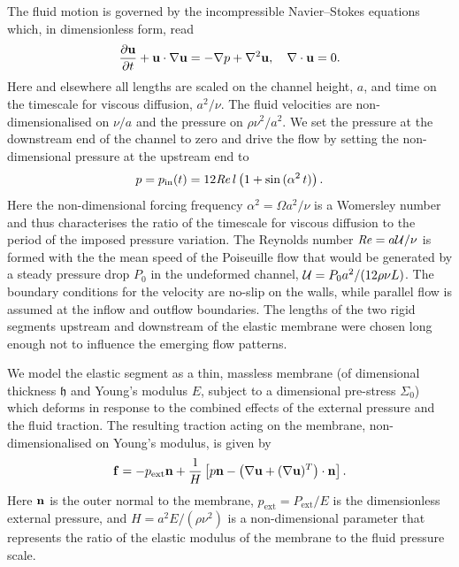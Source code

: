 \documentclass[aps,prl,reprint,superscriptaddress,floatfix]{revtex4-1}
\newcommand{\Rey}{\mathit{Re}}
\begin{document}
The fluid motion is governed by the incompressible Navier--Stokes
equations which, in dimensionless form, read
\begin{equation}
\dfrac{\partial {\bf u}}{\partial t} + {\bf u} \cdot \nabla {\bf
u} = -\nabla  p + \nabla^2  {\bf u},\quad
\nabla \cdot {\bf u}= 0.
\label{eq:NSeqn}
\end{equation}
Here and elsewhere all lengths are scaled on the channel height,
$a$, and time on the timescale for viscous diffusion, $a^2/\nu$.
The fluid velocities are non-dimensionalised on $\nu/a$ and the
pressure on $\rho\nu^2/a^2$.
We set the pressure at the downstream end of the channel to zero
and drive the flow by setting the non-dimensional pressure at the
upstream end to
\begin{equation}
\label{inflow_bc}
p = p_{\rm in}(t)=12 \Rey \,l \left(1 + \sin\,(\alpha^2 \, t)\right).
\end{equation}
Here the non-dimensional forcing frequency $\alpha^2 = \Omega a^2/\nu$ is
a Womersley number and thus characterises the ratio of the
timescale for viscous diffusion to the period of the imposed pressure variation.
The Reynolds number $\Rey = a{\cal U}/\nu$ is formed with the the mean
speed of the Poiseuille flow that would be generated by a steady pressure
drop $P_0$ in the undeformed channel, ${\cal U} = P_0 a^2/(12 \rho \nu
L)$. The boundary conditions for the velocity are no-slip on the walls,
while parallel flow is assumed at the inflow and outflow
boundaries. The lengths of the two rigid segments upstream and
downstream of the elastic membrane were chosen long enough not to
influence the emerging flow patterns. 

We model the elastic segment as a thin, massless
membrane (of dimensional thickness $\mathfrak{h}$ and Young's
modulus $E$, subject to a dimensional pre-stress $\Sigma_0$) which deforms in
response to the combined effects of the external pressure
and the fluid traction. The resulting traction acting on the
membrane, non-dimensionalised on Young's modulus, is given by
\begin{equation}
\label{eq:nondimloadvector}
{\bf f}=-p_\text{ext} {\bf n} + \frac{1}{H} \left[ p {\bf n} -
  \left(\nabla {\bf u} + (\nabla {\bf u})^T\right) \cdot {\bf n} \right].
\end{equation}
Here ${\bf n}$ is the outer normal to the membrane,
$p_\text{ext}=P_\text{ext}/E$ is the dimensionless external
pressure, and  $H=a^2 E/(\rho\nu^2)$  is a non-dimensional parameter
that represents the ratio of the elastic modulus of the membrane to
the fluid pressure scale. 
\end{document}
